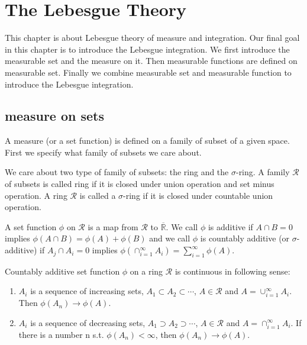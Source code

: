 % 
\chapter{The Lebesgue Theory}
This chapter is about Lebesgue theory of measure and integration. Our final goal in this chapter is to introduce the Lebesgue integration. We first introduce the measurable set and the measure on it. Then measurable functions are defined on measurable set. Finally we combine measurable set and measurable function to introduce the Lebesgue integration.
\section{measure on sets}
A measure (or a set function) is defined on a family of subset of a given space. First we specify what family of subsets we care about.\par
We care about two type of family of subsets: the ring and the $\sigma$-ring. A family $\mathscr{R}$ of subsets is called ring if it is closed under union operation and set minus operation. A ring $\mathscr{R}$ is called a $\sigma$-ring if it is closed under countable union operation.\par
A set function $\phi$ on $\mathscr{R}$ is a map from $\mathscr{R}$ to $\overline{\mathbb{R}}$. We call $\phi$ is additive if $A\cap B=0$ implies $\phi(A\cap B)=\phi(A)+\phi(B)$ and we call $\phi$ is countably additive (or $\sigma$-additive) if $A_j\cap A_i=0$ implies $\phi(\cap_{i=1}^\infty A_i)=\sum_{i=1}^\infty\phi(A)$.\par 
Countably additive set function $\phi$ on a ring $\mathscr{R}$ is continuous in following sense:
\begin{enumerate}
    \item $A_i$ is a sequence of increasing sets, $A_1\subset A_2\subset\cdots$, $A\in \mathscr{R}$ and $A=\cup_{i=1}^\infty A_i$. Then $\phi(A_n)\to \phi(A)$.
    \item $A_i$ is a sequence of decreasing sets, $A_1\supset A_2\supset\cdots$, $A\in \mathscr{R}$ and $A=\cap_{i=1}^\infty A_i$. If there is a number n s.t. $\phi(A_n)<\infty$, then $\phi(A_n)\to \phi(A)$.
\end{enumerate}
